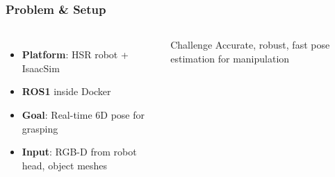 \documentclass[serif, aspectratio=169, 9pt]{beamer}
\begin{document}
\begin{frame}
\frametitle{Problem \& Setup}
    \begin{columns}
        \begin{itemize}
            \item \textbf{Platform}: HSR robot + IsaacSim
            \item \textbf{ROS1} inside Docker
            \item \textbf{Goal}: Real-time 6D pose for grasping
            \item \textbf{Input}: RGB-D from robot head, object meshes
        \end{itemize}
        \vspace{0.3em}
        \begin{block}{Challenge}
            Accurate, robust, fast pose estimation for manipulation

\end{block}
\end{columns}
\end{frame}
\end{document}

